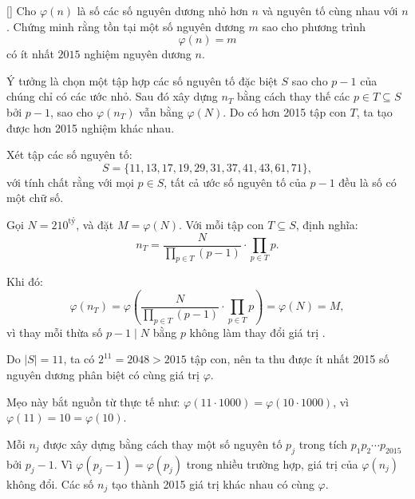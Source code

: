 \documentclass[../09-contruction-methods.tex]{subfiles}
\begin{document}
\begin{example*}\label{example:USA-2015-TSTST-P5}[\textbf{}]
	Cho \( \varphi(n) \) là số các số nguyên dương nhỏ hơn \( n \) và nguyên tố cùng nhau với \( n \).  
	Chứng minh rằng tồn tại một số nguyên dương \( m \) sao cho phương trình
	\[
		\varphi(n) = m
	\]
	có ít nhất \( 2015 \) nghiệm nguyên dương \( n \).
\end{example*}

\begin{story*}
    Ý tưởng là chọn một tập hợp các số nguyên tố đặc biệt \( S \) sao cho \( p - 1 \) của chúng chỉ có các ước nhỏ. Sau đó xây dựng \( n_T \) bằng cách thay thế các \( p \in T \subseteq S \) bởi \( p - 1 \), sao cho \( \varphi(n_T) \) vẫn bằng \( \varphi(N) \). Do có hơn 2015 tập con \( T \), ta tạo được hơn 2015 nghiệm khác nhau.
\end{story*}

\begin{soln}\footnotemark
	Xét tập các số nguyên tố:
	\[
		S = \{ 11, 13, 17, 19, 29, 31, 37, 41, 43, 61, 71 \},
	\]
	với tính chất rằng với mọi \( p \in S \), tất cả ước số nguyên tố của \( p - 1 \) đều là số có một chữ số.
	
	Gọi \( N = 210^{\text{tỷ}} \), và đặt \( M = \varphi(N) \).
	Với mỗi tập con \( T \subseteq S \), định nghĩa:
	\[
		n_T = \frac{N}{\prod_{p \in T}(p-1)} \cdot \prod_{p \in T} p.
	\]
	
	Khi đó:
	\[
		\varphi(n_T) = \varphi\left(\frac{N}{\prod_{p \in T}(p-1)} \cdot \prod_{p \in T} p\right) = \varphi(N) = M,
	\]
	vì thay mỗi thừa số \( p-1 \mid N \) bằng \( p \) không làm thay đổi giá trị .
	
	Do \( |S| = 11 \), ta có \( 2^{11} = 2048 > 2015 \) tập con, nên ta thu được ít nhất 2015 số nguyên dương phân biệt có cùng giá trị \( \varphi \).
\end{soln}


\begin{remark*}
	Mẹo này bắt nguồn từ thực tế như:  
	\( \varphi(11 \cdot 1000) = \varphi(10 \cdot 1000) \), vì \( \varphi(11) = 10 = \varphi(10) \).
\end{remark*}

\begin{story*}
    Mỗi \( n_j \) được xây dựng bằng cách thay một số nguyên tố \( p_j \) trong tích \( p_1p_2\cdots p_{2015} \) bởi \( p_j - 1 \). Vì \( \varphi(p_j - 1) = \varphi(p_j) \) trong nhiều trường hợp, giá trị của \( \varphi(n_j) \) không đổi. Các số \( n_j \) tạo thành 2015 giá trị khác nhau có cùng \( \varphi \).
\end{story*}
\end{document}
